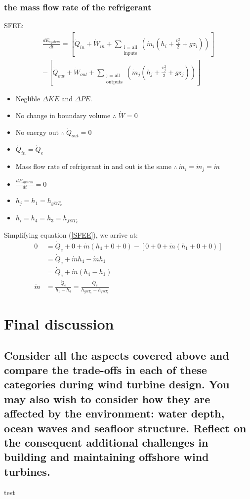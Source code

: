 \documentclass[12pt]{article}
\numberwithin{equation}{section}
\begin{document}
\begin{flushleft}
\subsubsection[Refrigerant mass flow rate.]{the mass flow rate of the refrigerant}
SFEE:
\begin{multline}
  \frac{dE_{system}}{dt} = \left[ \dot{Q}_{in} + \dot{W}_{in} + \sum_{\substack{\text{i = all} \\ \text{inputs}}} \left( \dot{m}_i (h_i + \frac{v_i^2}{2} + gz_i) \right) \right] \\ - \left[ \dot{Q}_{out} + \dot{W}_{out} + \sum_{\substack{\text{j = all} \\ \text{outputs}}} \left( \dot{m}_j (h_j + \frac{v_j^2}{2} + gz_j) \right) \right]
  \label{SFEE}
\end{multline}
\begin{itemize}
  \item Neglible $\Delta KE$ and $\Delta PE$.
  \item No change in boundary volume $\therefore$ $\dot{W} = 0$
  \item No energy out $\therefore \ \dot{Q}_{out} = 0$
  \item $\dot{Q}_{in} = \dot{Q}_e$
  \item Mass flow rate of refrigerant in and out is the same $\therefore \ \dot{m}_i =\dot{m}_j = \dot{m}$
  \item $\frac{dE_{system}}{dt} = 0$
  \item $h_j = h_1 = h_{g@T_e}$
  \item $h_i = h_4 = h_3 = h_{f@T_c}$
\end{itemize}  
Simplifying equation (\ref{SFEE}), we arrive at:
\begin{align}
  0 &= \dot{Q}_{e} + 0 + \dot{m} (h_4 + 0 + 0) - \left[ 0 + 0 +  \dot{m} (h_1 + 0 + 0) \right]\\
  &= \dot{Q}_{e} + \dot{m} h_4 - \dot{m} h_1\\
  &= \dot{Q}_{e} + \dot{m} (h_4 - h_1)\\
  \dot{m} &= \frac{\dot{Q}_e}{h_1 - h_4} = \frac{\dot{Q}_e}{h_{g@T_e} - h_{f@T_c}}
\end{align}
\section{Final discussion}
\subsection*{Consider all the aspects covered above and compare the trade-offs in each of these categories during wind turbine design. You may also wish to consider how they are affected by the environment: water depth, ocean waves and seafloor structure. Reflect on the consequent additional challenges in building and maintaining offshore wind turbines.}
test


\end{flushleft}
\end{document}
